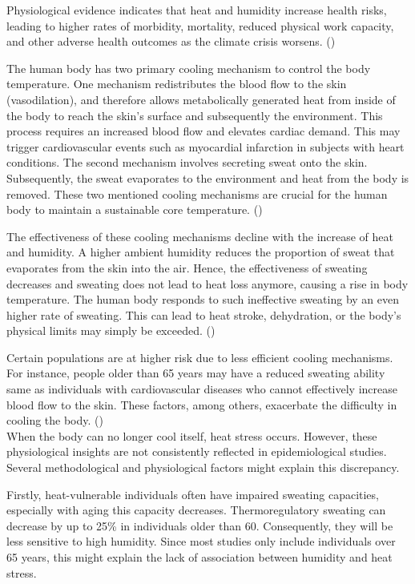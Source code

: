 \documentclass[
]{krantz}
\begin{document}
Physiological evidence indicates that heat and humidity increase health risks, leading to higher rates of morbidity, mortality, reduced physical work capacity, and other adverse health outcomes as the climate crisis worsens. (\citet{buzan})

The human body has two primary cooling mechanism to control the body temperature. One mechanism redistributes the blood flow to the skin (vasodilation), and therefore allows metabolically generated heat from inside of the body to reach the skin's surface and subsequently the environment. This process requires an increased blood flow and elevates cardiac demand. This may trigger cardiovascular events such as myocardial infarction in subjects with heart conditions.
The second mechanism involves secreting sweat onto the skin. Subsequently, the sweat evaporates to the environment and heat from the body is removed. These two mentioned cooling mechanisms are crucial for the human body to maintain a sustainable core temperature. (\citet{ebi})

The effectiveness of these cooling mechanisms decline with the increase of heat and humidity. A higher ambient humidity reduces the proportion of sweat that evaporates from the skin into the air. Hence, the effectiveness of sweating decreases and sweating does not lead to heat loss anymore, causing a rise in body temperature. The human body responds to such ineffective sweating by an even higher rate of sweating. This can lead to heat stroke, dehydration, or the body's physical limits may simply be exceeded. (\citet{bald})

Certain populations are at higher risk due to less efficient cooling mechanisms. For instance, people older than 65 years may have a reduced sweating ability same as individuals with cardiovascular diseases who cannot effectively increase blood flow to the skin. These factors, among others, exacerbate the difficulty in cooling the body. (\citet{ebi})\\
When the body can no longer cool itself, heat stress occurs. However, these physiological insights are not consistently reflected in epidemiological studies. Several methodological and physiological factors might explain this discrepancy.

Firstly, heat-vulnerable individuals often have impaired sweating capacities, especially with aging this capacity decreases. Thermoregulatory sweating can decrease by up to 25\% in individuals older than 60. Consequently, they will be less sensitive to high humidity. Since most studies only include individuals over 65 years, this might explain the lack of association between humidity and heat stress.
\end{document}
